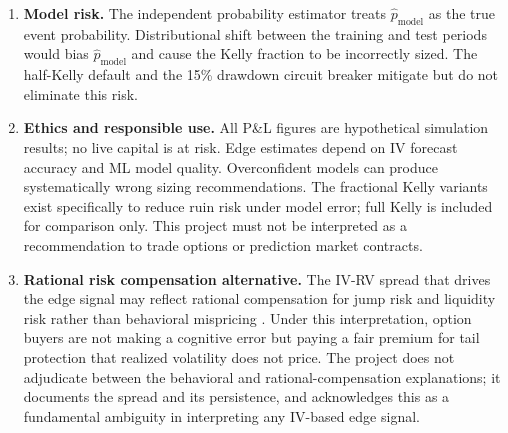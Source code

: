 \documentclass[12pt, letterpaper]{article}
\begin{document}
\begin{enumerate}
  \newpage
  \item \textbf{Model risk.}  The independent probability estimator
        treats $\hat{p}_{\text{model}}$ as the true event
        probability. Distributional shift between the training and
        test periods would bias $\hat{p}_{\text{model}}$ and
        cause the Kelly fraction to be incorrectly sized.
        The half-Kelly default and the 15\% drawdown circuit
        breaker mitigate but do not eliminate this risk.

  \item \textbf{Ethics and responsible use.}  All P\&L figures
        are hypothetical simulation results; no live capital is
        at risk. Edge estimates depend on IV forecast accuracy
        and ML model quality. Overconfident models can produce
        systematically wrong sizing recommendations. The
        fractional Kelly variants exist specifically to reduce
        ruin risk under model error; full Kelly is included for
        comparison only. This project must not be interpreted
        as a recommendation to trade options or prediction
        market contracts.

  \item \textbf{Rational risk compensation alternative.}  The
        IV-RV spread that drives the edge signal may reflect
        rational compensation for jump risk and liquidity risk
        rather than behavioral mispricing \citep{Fama1970}. Under
        this interpretation, option buyers are not making a
        cognitive error but paying a fair premium for tail
        protection that realized volatility does not price.
        The project does not adjudicate between the behavioral
        and rational-compensation explanations; it documents
        the spread and its persistence, and acknowledges this
        as a fundamental ambiguity in interpreting any
        IV-based edge signal.
\end{enumerate}

\newpage
\end{document}
